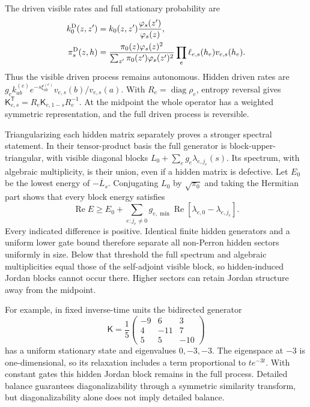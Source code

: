 \documentclass[aps,pre,reprint,amsmath,amssymb,longbibliography,floatfix]{revtex4-2}
\begin{document}
The driven visible rates and full stationary probability are
\begin{align}
 k_0^{\rm D}(z,z')&=k_0(z,z')
             \frac{\varphi_s(z')}{\varphi_s(z)},\nonumber\\
 \pi_s^{\rm D}(z,h)&=
 \frac{\pi_0(z)\varphi_s(z)^2}
      {\sum_{z'}\pi_0(z')\varphi_s(z')^2}
 \prod_e\ell_{e,s}(h_e)v_{e,s}(h_e).
 \label{eq:hidden-general-driven}
\end{align}
Thus the visible driven process remains autonomous. Hidden driven rates
are $g_e k^{(e)}_{ab}e^{-s\xi^{(e)}_{ab}}
v_{e,s}(b)/v_{e,s}(a)$.
With $R_e=\operatorname{diag}\rho_e$, entropy reversal gives
$\mathsf K_{e,s}^{\mathsf T}=R_e\mathsf K_{e,1-s}R_e^{-1}$.
At the midpoint the whole operator has a weighted symmetric
representation, and the full driven process is reversible.

Triangularizing each hidden matrix separately proves a stronger
spectral statement. In their tensor-product basis the full generator
is block-upper-triangular, with visible diagonal blocks
$L_0+\sum_e g_e\lambda_{e,j_e}(s)$.
Its spectrum, with algebraic multiplicity, is their union, even if a
hidden matrix is defective. Let $E_0$ be the lowest energy of
$-\overline L_s$. Conjugating $L_0$ by $\sqrt{\pi_0}$ and taking the
Hermitian part shows that every block energy satisfies
\begin{equation}
 \operatorname{Re}E\ge E_0+
 \sum_{e:j_e\ne0}g_{e,\min}
 \operatorname{Re}\left[\lambda_{e,0}-\lambda_{e,j_e}\right].
 \label{eq:hidden-general-gap}
\end{equation}
Every indicated difference is positive. Identical finite hidden
generators and a uniform lower gate bound therefore separate all
non-Perron hidden sectors uniformly in size. Below that threshold
the full spectrum and algebraic multiplicities equal those of the
self-adjoint visible block, so hidden-induced Jordan blocks cannot
occur there. Higher sectors can retain Jordan structure away from
the midpoint.

For example, in fixed inverse-time units the bidirected generator
\begin{equation}
 \mathsf K=\frac15
 \begin{pmatrix}-9&6&3\\4&-11&7\\5&5&-10\end{pmatrix}
 \label{eq:hidden-Jordan-example}
\end{equation}
has a uniform stationary state and eigenvalues $0,-3,-3$.
The eigenspace at $-3$ is one-dimensional, so its relaxation includes
a term proportional to $t e^{-3t}$. With constant gates this hidden
Jordan block remains in the full process. Detailed balance guarantees
diagonalizability through a symmetric similarity transform, but
diagonalizability alone does not imply detailed balance.
\end{document}
